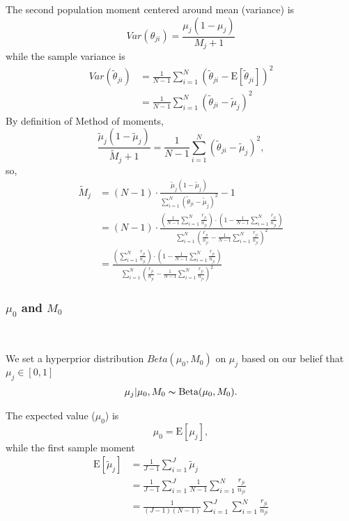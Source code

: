 \documentclass[11pt,reqno]{amsart}
\begin{document}
The second population moment centered around mean (variance) is
\begin{equation}
 Var(\theta_{ji}) = \frac{\mu_j(1-\mu_j)}{M_j+1}
\end{equation}
while the sample variance is
\begin{equation}
 \begin{split}
  Var(\tilde{\theta}_{ji}) &= \frac{1}{N-1}\sum_{i=1}^N(\tilde{\theta}_{ji}-\text{E}[\tilde{\theta}_{ji}])^2\\ &= \frac{1}{N-1}\sum_{i=1}^N(\tilde{\theta}_{ji}-\tilde{\mu}_j)^2
 \end{split}
\end{equation}
By definition of Method of moments,
\begin{equation}
  \frac{\tilde{\mu}_j(1-\tilde{\mu}_j)}{\tilde{M}_j+1} = \frac{1}{N-1}\sum_{i=1}^N(\tilde{\theta}_{ji}-\tilde{\mu}_j)^2,
\end{equation}
so,
\begin{equation}
\begin{split}
 \tilde{M}_j &= (N-1)\cdot\frac{\tilde{\mu}_j(1-\tilde{\mu}_j)}{\sum_{i=1}^N(\tilde{\theta}_{ji}-\tilde{\mu}_j)^2}-1\\ &= (N-1)\cdot\frac{\left(\frac{1}{N-1}\sum_{i=1}^N\frac{r_{ji}}{n_{ji}}\right)\cdot\left(1-\frac{1}{N-1}\sum_{i=1}^N\frac{r_{ji}}{n_{ji}}\right)}{\sum_{i=1}^N\left(\frac{r_{ji}}{n_{ji}}-\frac{1}{N-1}\sum_{i=1}^N\frac{r_{ji}}{n_{ji}}\right)^2}\\ &= \frac{\left(\sum_{i=1}^N\frac{r_{ji}}{n_{ji}}\right)\cdot\left(1-\frac{1}{N-1}\sum_{i=1}^N\frac{r_{ji}}{n_{ji}}\right)}{\sum_{i=1}^N\left(\frac{r_{ji}}{n_{ji}}-\frac{1}{N-1}\sum_{i=1}^N\frac{r_{ji}}{n_{ji}}\right)^2}
\end{split}
\end{equation}

\subsubsection{$\mu_0$ and $M_0$}\

We set a hyperprior distribution $Beta(\mu_0,M_0)$ on $\mu_j$ based on our belief that $\mu_j\in[0,1]$
\begin{align}
 \mu_j|\mu_0,M_0\thicksim \text{Beta}(\mu_0,M_0).
\end{align}

The expected value ($\mu_0$) is
\begin{equation}
 \mu_0=\text{E}[\mu_j],
\end{equation}
while the first sample moment
\begin{equation}
\begin{split}
\text{E}[\tilde{\mu}_j] &= \frac{1}{J-1}\sum_{i=1}^J\tilde{\mu}_j\\ &=  \frac{1}{J-1}\sum_{i=1}^J\frac{1}{N-1}\sum_{i=1}^N\frac{r_{ji}}{n_{ji}}\\ &=\frac{1}{(J-1)(N-1)}\sum_{i=1}^J\sum_{i=1}^N\frac{r_{ji}}{n_{ji}}
\end{split}
\end{equation}
\end{document}
